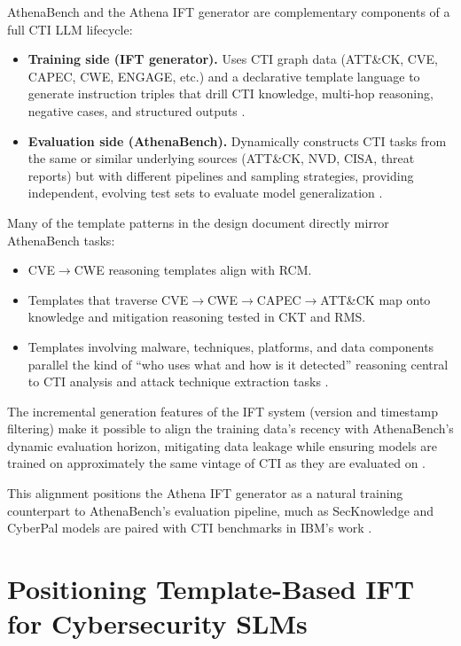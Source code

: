 \documentclass[unnumsec,webpdf,contemporary,large]{oup-authoring-template}
\theoremstyle{thmstyleone}
\theoremstyle{thmstyletwo}
\theoremstyle{thmstylethree}
\begin{document}
AthenaBench and the Athena IFT generator are complementary components of a full CTI LLM lifecycle:

\begin{itemize}
  \item \textbf{Training side (IFT generator).} Uses CTI graph data (ATT\&CK, CVE, CAPEC, CWE, ENGAGE, etc.) and a declarative template language to generate instruction triples that drill CTI knowledge, multi-hop reasoning, negative cases, and structured outputs \cite{cardei2025ift}.
  \item \textbf{Evaluation side (AthenaBench).} Dynamically constructs CTI tasks from the same or similar underlying sources (ATT\&CK, NVD, CISA, threat reports) but with different pipelines and sampling strategies, providing independent, evolving test sets to evaluate model generalization \cite{alam2025athenabench}.
\end{itemize}

Many of the template patterns in the design document directly mirror AthenaBench tasks:
\begin{itemize}
  \item CVE$\rightarrow$CWE reasoning templates align with RCM.
  \item Templates that traverse CVE$\rightarrow$CWE$\rightarrow$CAPEC$\rightarrow$ATT\&CK map onto knowledge and mitigation reasoning tested in CKT and RMS.
  \item Templates involving malware, techniques, platforms, and data components parallel the kind of ``who uses what and how is it detected'' reasoning central to CTI analysis and attack technique extraction tasks \cite{cardei2025ift}.
\end{itemize}

The incremental generation features of the IFT system (version and timestamp filtering) make it possible to align the training data's recency with AthenaBench's dynamic evaluation horizon, mitigating data leakage while ensuring models are trained on approximately the same vintage of CTI as they are evaluated on \cite{cardei2025ift,alam2025athenabench}.

This alignment positions the Athena IFT generator as a natural training counterpart to AthenaBench's evaluation pipeline, much as SecKnowledge and CyberPal models are paired with CTI benchmarks in IBM's work \cite{levi2024cyberpal,levi2025toward}.

\section{Positioning Template-Based IFT for Cybersecurity SLMs}
\label{sec:athena-ift}
\end{document}
